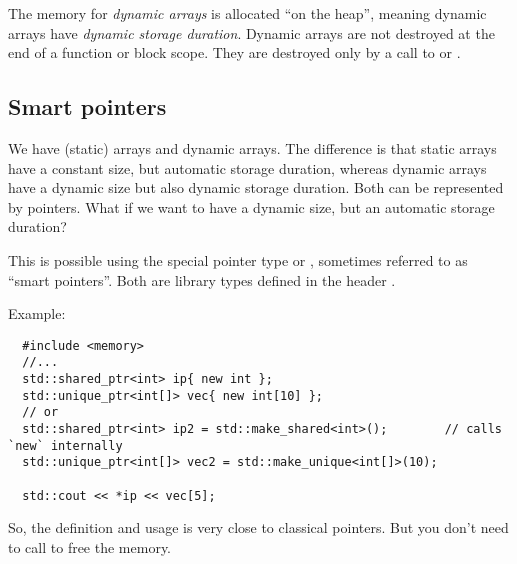 The memory for \emph{dynamic arrays} is allocated ``on the heap'', meaning dynamic arrays have \emph{dynamic storage duration}. Dynamic arrays are not destroyed at
the end of a function or block scope. They are destroyed only by a call to  or .


\subsection{Smart pointers}
We have (static) arrays and dynamic arrays. The difference is that static arrays have a constant size, but automatic storage duration, whereas dynamic arrays
have a dynamic size but also dynamic storage duration. Both can be represented by pointers. What if we want to have a dynamic size, but an automatic
storage duration?

This is possible using the special pointer type  or , sometimes referred to as ``smart pointers''. Both are library
types defined in the header .

Example:
\begin{verbatim}
  #include <memory>
  //...
  std::shared_ptr<int> ip{ new int };
  std::unique_ptr<int[]> vec{ new int[10] };
  // or
  std::shared_ptr<int> ip2 = std::make_shared<int>();        // calls `new` internally
  std::unique_ptr<int[]> vec2 = std::make_unique<int[]>(10);

  std::cout << *ip << vec[5];
\end{verbatim}
%
So, the definition and usage is very close to classical pointers. But you don't need to call  to free the memory.

